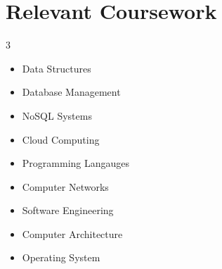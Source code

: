 \documentclass[letterpaper,11pt]{article}
\makeatletter
\newcommand{\resumeItem}[1]{
  \item\small{
    {#1 \vspace{-2pt}}
  }
}
\newcommand{\resumeSubheading}[4]{
  \vspace{-2pt}\item
    \begin{tabular*}{1.0\textwidth}[t]{l@{\extracolsep{\fill}}r}
      \textbf{#1} & \textbf{\small #2} \\
      \textit{\small#3} & \textit{\small #4} \\
    \end{tabular*}\vspace{-7pt}
}
\newcommand{\resumeSubHeadingListStart}{\begin{itemize}[leftmargin=0.0in, label={}]}
\newcommand{\resumeSubHeadingListEnd}{\end{itemize}}
\newcommand{\resumeItemListStart}{\begin{itemize}}
\newcommand{\resumeItemListEnd}{\end{itemize}\vspace{-5pt}}
\makeatother
\begin{document}
\section{Relevant Coursework}
        \begin{multicols}{3}
            \begin{itemize}[itemsep=-5pt, parsep=3pt]
                \item Data Structures
                \item Database Management
                \item NoSQL Systems
                \item Cloud Computing
                \item Programming Langauges
                \item Computer Networks
                \item Software Engineering
                \item Computer Architecture
                \item Operating System
            \end{itemize}
        \end{multicols}
        \vspace*{2.0\multicolsep}


        
\end{document}
